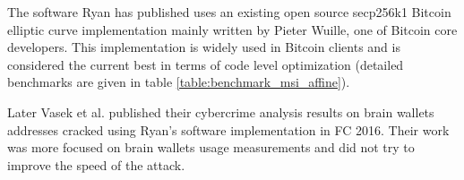 The software Ryan has published uses an existing open source secp256k1 Bitcoin elliptic curve implementation mainly written by Pieter Wuille, one of Bitcoin core developers. This implementation is widely used in Bitcoin clients and is considered the current best in terms of code level optimization (detailed benchmarks are given in  table \ref{table:benchmark_msi_affine}).

Later Vasek et al. published their cybercrime analysis results on brain wallets addresses cracked using Ryan's software implementation in FC 2016. Their work was more focused on brain wallets usage measurements and did not try to improve the speed of the attack.
